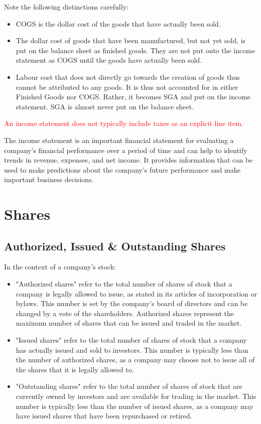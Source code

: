 \documentclass{article}
\begin{document}
Note the following distinctions carefully:
\begin{itemize}
    \item COGS is the dollar cost of the goods that have actually been sold.
    \item The dollar cost of goods that have been manufactured, but not yet sold, is put on the balance sheet as finished goods. They are not put onto the income statement as COGS until the goods have actually been sold.
    \item Labour cost that does not directly go towards the creation of goods thus cannot be attributed to any goods. It is thus not accounted for in either Finished Goods nor COGS. Rather, it becomes SGA and put on the income statement. SGA is almost never put on the balance sheet. 
\end{itemize}

\textcolor{red}{An income statement does not typically include taxes as an explicit line item.}

The income statement is an important financial statement for evaluating a company's financial performance over a period of time and can help to identify trends in revenue, expenses, and net income. It provides information that can be used to make predictions about the company's future performance and make important business decisions.


\section{Shares}
\subsection{Authorized, Issued \& Outstanding Shares}
In the context of a company's stock:
\begin{itemize}
\item "Authorized shares" refer to the total number of shares of stock that a company is legally allowed to issue, as stated in its articles of incorporation or bylaws. This number is set by the company's board of directors and can be changed by a vote of the shareholders. Authorized shares represent the maximum number of shares that can be issued and traded in the market.
\item "Issued shares" refer to the total number of shares of stock that a company has actually issued and sold to investors. This number is typically less than the number of authorized shares, as a company may choose not to issue all of the shares that it is legally allowed to.
\item "Outstanding shares" refer to the total number of shares of stock that are currently owned by investors and are available for trading in the market. This number is typically less than the number of issued shares, as a company may have issued shares that have been repurchased or retired.
\end{itemize}
\end{document}
